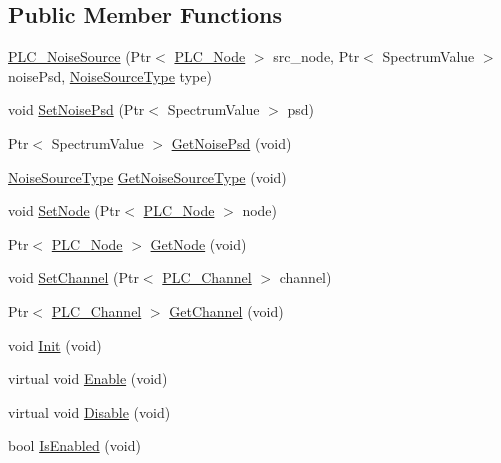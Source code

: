 \subsection*{\-Public \-Member \-Functions}
\begin{DoxyCompactItemize}
\item 
\hyperlink{classns3_1_1PLC__NoiseSource_a1032d5a50bb3141a0ff1d105a6b55a63}{\-P\-L\-C\-\_\-\-Noise\-Source} (\-Ptr$<$ \hyperlink{classns3_1_1PLC__Node}{\-P\-L\-C\-\_\-\-Node} $>$ src\-\_\-node, \-Ptr$<$ \-Spectrum\-Value $>$ noise\-Psd, \hyperlink{classns3_1_1PLC__NoiseSource_a3f5751ed7e0ffe2f0c9ad37d2c75ff2b}{\-Noise\-Source\-Type} type)
\item 
void \hyperlink{classns3_1_1PLC__NoiseSource_afd6623a52b8a5624a8e6d86a362c45e0}{\-Set\-Noise\-Psd} (\-Ptr$<$ \-Spectrum\-Value $>$ psd)
\item 
\-Ptr$<$ \-Spectrum\-Value $>$ \hyperlink{classns3_1_1PLC__NoiseSource_ab0fc8962c55913f1ca375d07b2b318ac}{\-Get\-Noise\-Psd} (void)
\item 
\hyperlink{classns3_1_1PLC__NoiseSource_a3f5751ed7e0ffe2f0c9ad37d2c75ff2b}{\-Noise\-Source\-Type} \hyperlink{classns3_1_1PLC__NoiseSource_ad9c3d566a21a422a6b2b1f61c6d8ff2e}{\-Get\-Noise\-Source\-Type} (void)
\item 
void \hyperlink{classns3_1_1PLC__NoiseSource_a1c3237553ba374e899af1a10baeccdf3}{\-Set\-Node} (\-Ptr$<$ \hyperlink{classns3_1_1PLC__Node}{\-P\-L\-C\-\_\-\-Node} $>$ node)
\item 
\-Ptr$<$ \hyperlink{classns3_1_1PLC__Node}{\-P\-L\-C\-\_\-\-Node} $>$ \hyperlink{classns3_1_1PLC__NoiseSource_a65d247ba7af27380c2b752c3de4ca95c}{\-Get\-Node} (void)
\item 
void \hyperlink{classns3_1_1PLC__NoiseSource_aceb67ba0b75a9e1ee5b87d9e5dd06bf6}{\-Set\-Channel} (\-Ptr$<$ \hyperlink{classns3_1_1PLC__Channel}{\-P\-L\-C\-\_\-\-Channel} $>$ channel)
\item 
\-Ptr$<$ \hyperlink{classns3_1_1PLC__Channel}{\-P\-L\-C\-\_\-\-Channel} $>$ \hyperlink{classns3_1_1PLC__NoiseSource_ac613d35629021be467d3a31786cf79d1}{\-Get\-Channel} (void)
\item 
void \hyperlink{classns3_1_1PLC__NoiseSource_a3ab9d89fc6110f80ba8771bd65813f94}{\-Init} (void)
\item 
virtual void \hyperlink{classns3_1_1PLC__NoiseSource_a1753484062d53fe249c9a28f9db1ae1d}{\-Enable} (void)
\item 
virtual void \hyperlink{classns3_1_1PLC__NoiseSource_a73fae674a603ed0da7845cbdba4845f1}{\-Disable} (void)
\item 
bool \hyperlink{classns3_1_1PLC__NoiseSource_a4c3b2917a7f6ccd83b1f1db98d3b4d8b}{\-Is\-Enabled} (void)
\end{DoxyCompactItemize}
